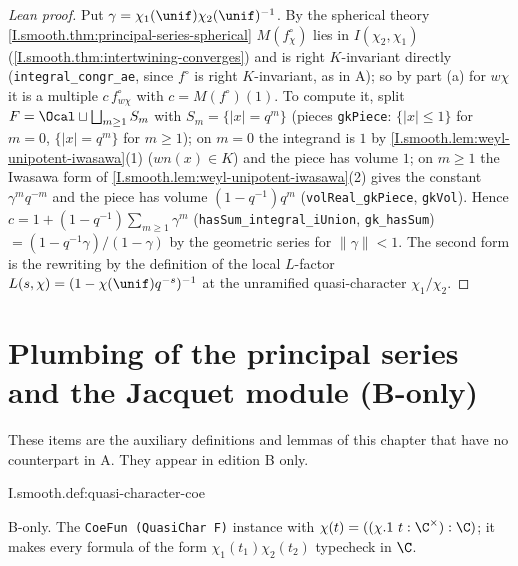 \begin{proof}[Lean proof]
Put $\gamma=\chi_1(\unif)\chi_2(\unif)^{-1}$. By the spherical theory \cref{I.smooth.thm:principal-series-spherical} $M(f^\circ_{\chi})$ lies in $I(\chi_2,\chi_1)$ (\cref{I.smooth.thm:intertwining-converges}) and is right $K$-invariant directly (\texttt{integral\_congr\_ae}, since $f^\circ$ is right $K$-invariant, as in A); so by part (a) for $w\chi$ it is a multiple $c\,f^\circ_{w\chi}$ with $c=M(f^\circ)(1)$. To compute it, split $F=\Ocal\sqcup\bigsqcup_{m\ge1}S_m$ with $S_m=\{|x|=q^m\}$ (pieces \texttt{gkPiece}: $\{|x|\le1\}$ for $m=0$, $\{|x|=q^m\}$ for $m\ge1$); on $m=0$ the integrand is $1$ by \cref{I.smooth.lem:weyl-unipotent-iwasawa}(1) ($wn(x)\in K$) and the piece has volume $1$; on $m\ge1$ the Iwasawa form of \cref{I.smooth.lem:weyl-unipotent-iwasawa}(2) gives the constant $\gamma^m q^{-m}$ and the piece has volume $(1-q^{-1})q^m$ (\texttt{volReal\_gkPiece}, \texttt{gkVol}). Hence $c=1+(1-q^{-1})\sum_{m\ge1}\gamma^m$ (\texttt{hasSum\_integral\_iUnion}, \texttt{gk\_hasSum}) $=(1-q^{-1}\gamma)/(1-\gamma)$ by the geometric series for $\|\gamma\|<1$. The second form is the rewriting by the definition of the local $L$-factor $L(s,\chi)=(1-\chi(\unif)q^{-s})^{-1}$ at the unramified quasi-character $\chi_1/\chi_2$.
\end{proof}

\section{Plumbing of the principal series and the Jacquet module (B-only)}

\noindent These items are the auxiliary definitions and lemmas of this chapter that have no counterpart in A. They appear in edition B only.

\begin{definition}
\bonly
{}
\end{definition}
\begin{tfformal}{I.smooth.def:quasi-character-coe}
\begin{tffidelity}
B-only. The \texttt{CoeFun (QuasiChar F)} instance with $\chi(t)=((\chi.1\ t:\C^{\times}):\C)$; it makes every formula of the form $\chi_1(t_1)\chi_2(t_2)$ typecheck in $\C$.
\end{tffidelity}
\end{tfformal}

